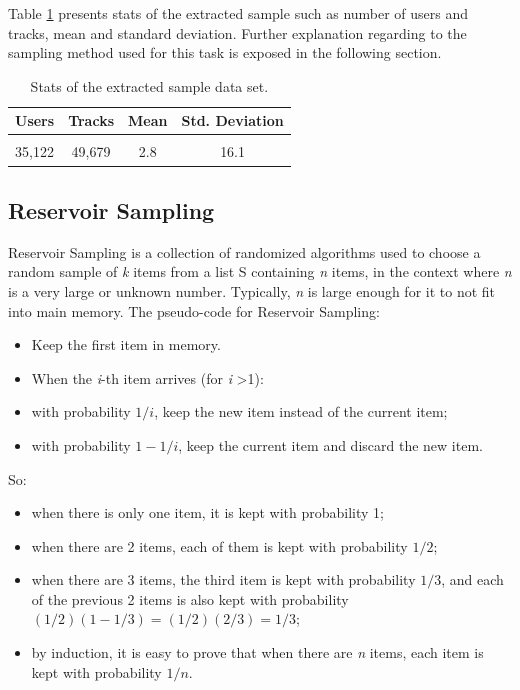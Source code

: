 \documentclass{article} %
\begin{document}
Table \ref{table:4} presents stats of the extracted sample such as number of users and tracks, mean and standard deviation. Further explanation regarding to the sampling method used for this task is exposed in the following section.

\begin{table}[!htbp]
\caption{Stats of the extracted sample data set.}
\label{table:4}
\begin{center}
\begin{tabular}{c c c c}
\multicolumn{1}{c}{\bf Users} & \multicolumn{1}{c}{\bf Tracks} & \multicolumn{1}{c}{\bf Mean} & \multicolumn{1}{c}{\bf Std. Deviation}
\\ \hline \\
35,122 & 49,679 & 2.8 & 16.1\\
\end{tabular}
\end{center}
\end{table}

\subsection{Reservoir Sampling}

Reservoir Sampling \cite{reservoirsampling} is a collection of randomized algorithms used to choose a random sample of \textit{k} items from a list S containing \textit{n} items, in the context where \textit{n} is a very large or unknown number. Typically, \textit{n} is large enough for it to not fit into main memory. The pseudo-code for Reservoir Sampling:

\begin{itemize}
    \item Keep the first item in memory.
    \item When the \textit{i}-th item arrives (for \textit{i} \textgreater 1):
    \item with probability $ 1 / i $, keep the new item instead of the current item;
    \item with probability $ 1-1 / i $, keep the current item and discard the new item.
\end{itemize}

So:

\begin{itemize}
    \item when there is only one item, it is kept with probability 1;
    \item when there are 2 items, each of them is kept with probability $ 1/2 $;
    \item when there are 3 items, the third item is kept with probability $ 1/3 $, and each of the previous 2 items is also kept with probability $ (1/2)(1-1/3) = (1/2)(2/3) = 1/3 $;
    \item by induction, it is easy to prove that when there are \textit{n} items, each item is kept with probability $ 1/n $.
\end{itemize}
\end{document}
